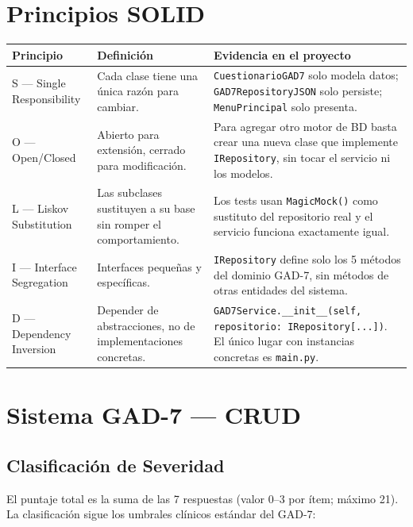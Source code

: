 \documentclass[12pt, a4paper]{article}
\begin{document}
\section{Principios SOLID}

\begin{tabular}{L{3.5cm} L{3.5cm} L{7cm}}
  \toprule
  \textbf{Principio} & \textbf{Definición} & \textbf{Evidencia en el proyecto} \\
  \midrule
  S — Single Responsibility &
    Cada clase tiene una única razón para cambiar. &
    \texttt{CuestionarioGAD7} solo modela datos; \texttt{GAD7RepositoryJSON}
    solo persiste; \texttt{MenuPrincipal} solo presenta. \\[8pt]
  O — Open/Closed &
    Abierto para extensión, cerrado para modificación. &
    Para agregar otro motor de BD basta crear una nueva clase que implemente
    \texttt{IRepository}, sin tocar el servicio ni los modelos. \\[8pt]
  L — Liskov Substitution &
    Las subclases sustituyen a su base sin romper el comportamiento. &
    Los tests usan \texttt{MagicMock()} como sustituto del repositorio real
    y el servicio funciona exactamente igual. \\[8pt]
  I — Interface Segregation &
    Interfaces pequeñas y específicas. &
    \texttt{IRepository} define solo los 5 métodos del dominio GAD-7, sin
    métodos de otras entidades del sistema. \\[8pt]
  D — Dependency Inversion &
    Depender de abstracciones, no de implementaciones concretas. &
    \texttt{GAD7Service.\_\_init\_\_(self, repositorio: IRepository[...])}. El
    único lugar con instancias concretas es \texttt{main.py}. \\
  \bottomrule
\end{tabular}

\section{Sistema GAD-7 — CRUD}

\subsection{Clasificación de Severidad}

El puntaje total es la suma de las 7 respuestas (valor 0--3 por ítem; máximo 21).
La clasificación sigue los umbrales clínicos estándar del GAD-7:
\end{document}
